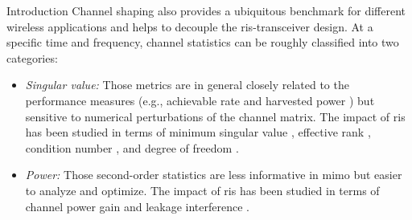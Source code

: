 \documentclass[journal]{IEEEtran}
\begin{document}
\begin{section}{Introduction}
	Channel shaping also provides a ubiquitous benchmark for different wireless applications and helps to decouple the \gls{ris}-transceiver design.
	At a specific time and frequency, channel statistics can be roughly classified into two categories:
	\begin{itemize}
		\item \emph{Singular value:} Those metrics are in general closely related to the performance measures (e.g., achievable rate and harvested power \cite{Shen2021}) but sensitive to numerical perturbations of the channel matrix. The impact of \gls{ris} has been studied in terms of minimum singular value \cite{ElMossallamy2021}, effective rank \cite{ElMossallamy2021,Meng2023}, condition number \cite{Zheng2022,Huang2023}, and degree of freedom \cite{Bafghi2022,Zheng2023,Chae2023}.
		\item \emph{Power:} Those second-order statistics are less informative in \gls{mimo} but easier to analyze and optimize. The impact of \gls{ris} has been studied in terms of channel power gain \cite{Wu2019,Shen2020a,Nerini2023,Nerini2024,Santamaria2023} and leakage interference \cite{Santamaria2023a}.
	\end{itemize}


\end{section}
\end{document}
